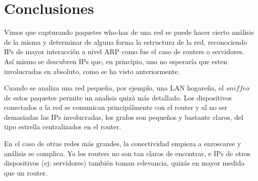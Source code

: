 \section{Conclusiones}

Vimos que capturando paquetes who-has de una red se puede hacer cierto análisis
de la misma y determinar de alguna forma la estructura de la red, reconociendo
IPs de mayor interacción a nivel ARP como fue el caso de routers o servidores.
Así mismo se descubren IPs que, en principio, uno no esperaría que esten involucradas
en absoluto, como se ha visto anteriormente.

Cuando se analiza una red pequeña, por ejemplo, una LAN hogareña, el $sniffeo$
de estos paquetes permite un analisis quizá más detallado. Los dispositivos 
conectados a la red se comunican principálmente con el router y al no ser 
demasiadas las IPs involucradas, los grafos son pequeños y bastante claros, del
tipo estrella centralizados en el router.

En el caso de otras redes más grandes, la conectividad empieza a enroscarse y 
análisis se complica. Ya los routers no son tan claros de encontrar, e IPs de 
otros dispositivos (ej: servidores) también toman relevancia, quizás en mayor medida
que un router. 
